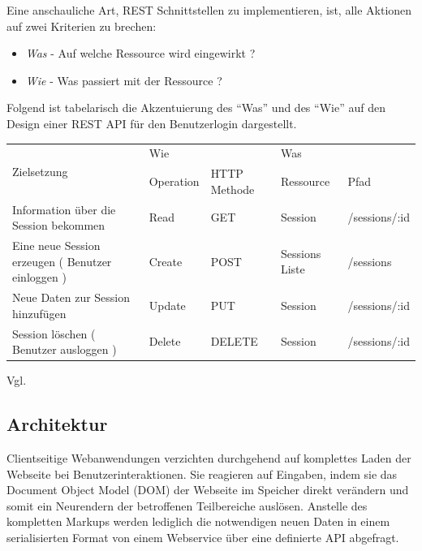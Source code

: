 Eine anschauliche Art, REST Schnittstellen zu implementieren, ist, alle Aktionen auf zwei Kriterien zu brechen:

\begin{itemize}
 \item \emph{Was} - Auf welche Ressource wird eingewirkt ?
 \item \emph{Wie} - Was passiert mit der Ressource ?
\end{itemize}

  Folgend ist tabelarisch die Akzentuierung des "`Was"' und des "`Wie"' auf den Design einer REST API für den Benutzerlogin dargestellt.

\begin{center}
    \begin{tabular}{ | p{5cm} | l | l | l | l |}
    \hline
    \multirow{2}{*}{Zielsetzung} & \multicolumn{2}{l|}{ Wie } & \multicolumn{2}{l|}{ Was } \\ \cline{2-5}
    & Operation & HTTP Methode & Ressource & Pfad \\ \hline
    Information über die Session  bekommen & Read & GET & Session & /sessions/:id \\ \hline
    Eine neue Session erzeugen ( Benutzer einloggen ) & Create & POST & Sessions Liste & /sessions \\ \hline
    Neue Daten zur Session hinzufügen & Update & PUT & Session & /sessions/:id \\ \hline
    Session löschen ( Benutzer ausloggen ) & Delete & DELETE & Session & /sessions/:id \\ \hline
    \end{tabular}
\end{center}

Vgl. \cite[Kap. REST and CRUD]{LaunchSchool:2016}

\subsection{Architektur}
\label{sec:architecture}

Clientseitige Webanwendungen verzichten durchgehend auf komplettes Laden der Webseite bei Benutzerinteraktionen. Sie reagieren auf Eingaben, indem sie das Document Object Model (DOM) der Webseite im Speicher direkt verändern und somit ein Neurendern der betroffenen Teilbereiche auslösen. Anstelle des kompletten Markups werden lediglich die notwendigen neuen Daten in einem serialisierten Format von einem Webservice über eine definierte API abgefragt.

